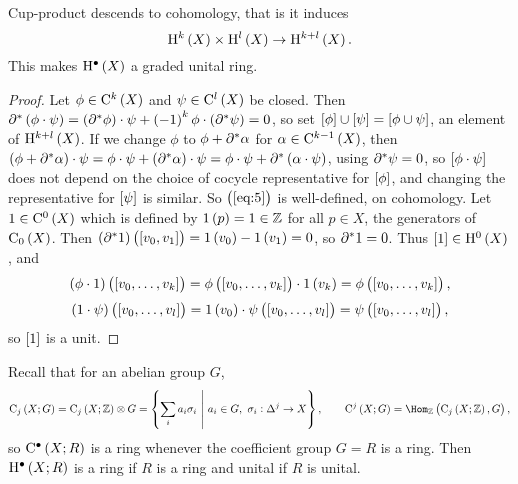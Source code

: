 \begin{corollary}
Cup-product descends to cohomology, that is it induces
\begin{equation}
\label{eq:5}
\H^k\br{X} \times \H^l\br{X} \to \H^{k + l}\br{X}.
\end{equation}
This makes $ \H^\bullet\br{X} $ a graded unital ring.
\end{corollary}

\begin{proof}
Let $ \phi \in \C^k\br{X} $ and $ \psi \in \C^l\br{X} $ be closed. Then $ \da^*\br{\phi \cdot \psi} = \br{\da^*\phi} \cdot \psi + \br{-1}^k\phi \cdot \br{\da^*\psi} = 0 $, so set $ \sbr{\phi} \cup \sbr{\psi} = \sbr{\phi \cup \psi} $, an element of $ \H^{k + l}\br{X} $. If we change $ \phi $ to $ \phi + \partial^*\alpha $ for $ \alpha \in \C^{k - 1}\br{X} $, then $ \br{\phi + \da^*\alpha} \cdot \psi = \phi \cdot \psi + \br{\da^*\alpha} \cdot \psi = \phi \cdot \psi + \da^*\br{\alpha \cdot \psi} $, using $ \partial^*\psi = 0 $, so $ \sbr{\phi \cdot \psi} $ does not depend on the choice of cocycle representative for $ \sbr{\phi} $, and changing the representative for $ \sbr{\psi} $ is similar. So $ \br{\ref{eq:5}} $ is well-defined, on cohomology. Let $ 1 \in \C^0\br{X} $ which is defined by $ 1\br{p} = 1 \in \ZZ $ for all $ p \in X $, the generators of $ \C_0\br{X} $. Then $ \br{\da^*1}\br{\sbr{v_0, v_1}} = 1\br{v_0} - 1\br{v_1} = 0 $, so $ \partial^*1 = 0 $. Thus $ \sbr{1} \in \H^0\br{X} $, and
$$ \br{\phi \cdot 1}\br{\sbr{v_0, \dots, v_k}} = \phi\br{\sbr{v_0, \dots, v_k}} \cdot 1\br{v_k} = \phi\br{\sbr{v_0, \dots, v_k}}, $$
$$ \br{1 \cdot \psi}\br{\sbr{v_0, \dots, v_l}} = 1\br{v_0} \cdot \psi\br{\sbr{v_0, \dots, v_l}} = \psi\br{\sbr{v_0, \dots, v_l}}, $$
so $ \sbr{1} $ is a unit.
\end{proof}

\pagebreak

Recall that for an abelian group $ G $,
$$ \C_j\br{X; G} = \C_j\br{X; \ZZ} \otimes G = \cbr{\sum_i a_i\sigma_i \st a_i \in G, \ \sigma_i : \Delta^j \to X}, \qquad \C^j\br{X; G} = \Hom_\ZZ\br{\C_j\br{X; \ZZ}, G}, $$
so $ \C^\bullet\br{X; R} $ is a ring whenever the coefficient group $ G = R $ is a ring. Then $ \H^\bullet\br{X; R} $ is a ring if $ R $ is a ring and unital if $ R $ is unital.

